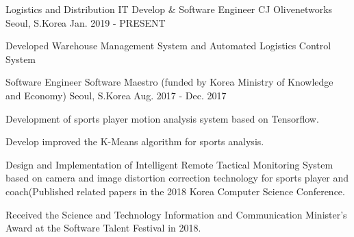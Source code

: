 

\begin{cventries}

  \cventry
    {Logistics and Distribution IT Develop \& Software Engineer} %
    {CJ Olivenetworks} %
    {Seoul, S.Korea} %
    {Jan. 2019 - PRESENT} %
    {
      \begin{cvitems} %
        \item {Developed Warehouse Management System and Automated Logistics Control System}
      \end{cvitems}
    }

  \cventry
    {Software Engineer} %
    {Software Maestro (funded by Korea Ministry of Knowledge and Economy)} %
    {Seoul, S.Korea} %
    {Aug. 2017 - Dec. 2017} %
    {
      \begin{cvitems} %
        \item {Development of sports player motion analysis system based on Tensorflow.}
        \item {Develop improved the K-Means algorithm for sports analysis.}
        \item {Design and Implementation of Intelligent Remote Tactical Monitoring System based on camera and image distortion correction technology for sports player and coach(Published related papers in the 2018 Korea Computer Science Conference.}
        \item {Received the Science and Technology Information and Communication Minister's Award at the Software Talent Festival in 2018.}
      \end{cvitems}
    }


\end{cventries}
